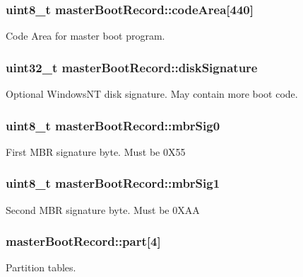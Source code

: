 \subsubsection[{code\+Area}]{\setlength{\rightskip}{0pt plus 5cm}uint8\+\_\+t master\+Boot\+Record\+::code\+Area\mbox{[}440\mbox{]}}\label{structmaster_boot_record_a26ca1fb4ebbff2cc1a54153b1dfcd688}
Code Area for master boot program. \hypertarget{structmaster_boot_record_a77151c641444c0653ff71a253f0423ef}{}
\subsubsection[{disk\+Signature}]{\setlength{\rightskip}{0pt plus 5cm}uint32\+\_\+t master\+Boot\+Record\+::disk\+Signature}\label{structmaster_boot_record_a77151c641444c0653ff71a253f0423ef}
Optional Windows\+N\+T disk signature. May contain more boot code. \hypertarget{structmaster_boot_record_a42b0b413ecb21ac5314d4f6bca05308f}{}
\subsubsection[{mbr\+Sig0}]{\setlength{\rightskip}{0pt plus 5cm}uint8\+\_\+t master\+Boot\+Record\+::mbr\+Sig0}\label{structmaster_boot_record_a42b0b413ecb21ac5314d4f6bca05308f}
First M\+B\+R signature byte. Must be 0\+X55 \hypertarget{structmaster_boot_record_aafbbcb4f6a2d1181c6458d4c9603df4f}{}
\subsubsection[{mbr\+Sig1}]{\setlength{\rightskip}{0pt plus 5cm}uint8\+\_\+t master\+Boot\+Record\+::mbr\+Sig1}\label{structmaster_boot_record_aafbbcb4f6a2d1181c6458d4c9603df4f}
Second M\+B\+R signature byte. Must be 0\+X\+A\+A \hypertarget{structmaster_boot_record_aa4e294e50f311635c10c92f4c99227c5}{}
\subsubsection[{part}]{ master\+Boot\+Record\+::part\mbox{[}4\mbox{]}}\label{structmaster_boot_record_aa4e294e50f311635c10c92f4c99227c5}
Partition tables. \hypertarget{structmaster_boot_record_afacfc863e98f64053cd9459c6dec948f}{}
